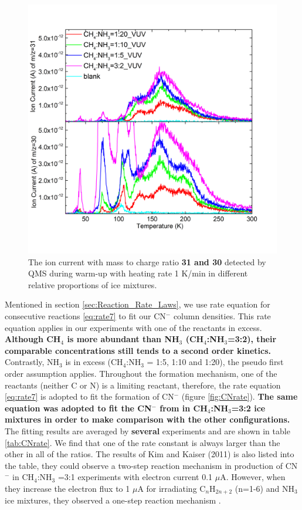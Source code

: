 \begin{figure}
\centering
\includegraphics[width=\textwidth]{figures/chapter3/mass31.png}
\caption{The ion current with mass to charge ratio \textbf{31 and 30} detected by QMS during warm-up with heating rate 1 K/min in different relative proportions of ice mixtures.}
\label{Mass31}
\end{figure}

Mentioned in section \ref{sec:Reaction_Rate_Laws}, we use rate equation for consecutive reactions \ref{eq:rate7} to fit our CN$^-$ column densities. This rate equation applies in our experiments with one of the reactants in excess. \textbf{Although CH$_4$ is more abundant than NH$_3$ (CH$_4$:NH$_3$=3:2), their comparable concentrations still tends to a second order kinetics.} Contrastly, NH$_3$ is in excess (CH$_4$:NH$_3$ = 1:5, 1:10 and 1:20), the pseudo first order assumption applies. Throughout the formation mechanism, one of the reactants (neither C or N) is a limiting reactant, therefore, the rate equation \ref{eq:rate7} is adopted to fit the formation of CN$^-$ (figure \ref{fig:CNrate}). \textbf{The same equation was adopted to fit the CN$^-$ from in  CH$_4$:NH$_3$=3:2 ice mixtures in order to make comparison with the other configurations.}\\

The fitting results are averaged by \textbf{several} experiments and are shown in table \ref{tab:CNrate}. We find that one of the rate constant is always larger than the other in all of the ratios. The results of Kim and Kaiser (2011) is also listed into the table, they could observe a two-step reaction mechanism in production of CN$^-$ in CH$_4$:NH$_3$ =3:1 experiments with electron current 0.1 $\mu$A. However, when they increase the electron flux to 1 $\mu$A for irradiating C$_n$H$_{2n+2}$ (n=1-6) and NH$_3$ ice mixtures, they observed a one-step reaction mechanism \cite{kim}.\\

